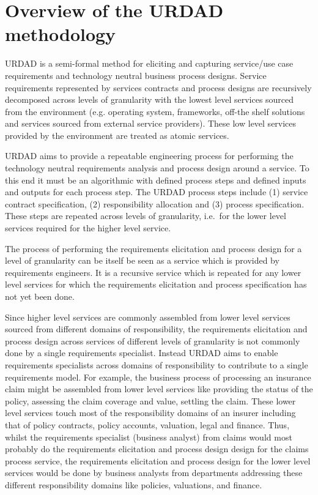 \section{Overview of the URDAD methodology \label{sec:urdadMethodology}}

URDAD is a semi-formal method for eliciting and capturing service/use case requirements and technology neutral business process designs\cite{solms_urdad_2010}. Service requirements represented by services contracts and process designs are recursively decomposed across levels of granularity with the lowest level services sourced from the environment (e.g. operating system, frameworks, off-the shelf solutions and services sourced from external service providers). These low level services provided by the environment are treated as atomic services.

URDAD aims to provide a repeatable engineering process for performing the technology neutral requirements analysis and process design around a service. To this end it must be an algorithmic with defined process steps and defined inputs and outputs for each process step. The URDAD process steps include (1) service contract specification, (2) responsibility allocation and (3) process specification. These steps are repeated across levels of granularity, i.e.\ for the lower level services required for the higher level service.

The process of performing the requirements elicitation and process design for a level of granularity can be itself be seen as a service which is provided by requirements engineers. It is a recursive service which is repeated for any lower level services for which the requirements elicitation and process specification has not yet been done.

Since higher level services are commonly assembled from lower level services sourced from different domains of responsibility, the requirements elicitation and process design across services of different levels of granularity is not commonly done by a single requirements specialist. Instead URDAD aims to enable requirements specialists across domains of responsibility to contribute to a single requirements model. For example, the business process of processing an insurance claim might be assembled from lower level services like providing the status of the policy, assessing the claim coverage and value, settling the claim. These lower level services touch most of the responsibility domains of an insurer including that of policy contracts, policy accounts, valuation, legal and finance. Thus, whilst the requirements specialist (business analyst) from claims would most probably do the requirements elicitation and process design design for the claims process service, the requirements elicitation and process design for the lower level services would be done by business analysts from departments addressing these different responsibility domains like policies, valuations, and finance.


